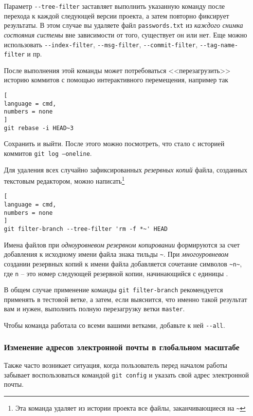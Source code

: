 \documentclass[%
	11pt,
	a4paper,
	utf8,
		]{article}
\begin{document}
Параметр \lstinline{--tree-filter} заставляет выполнить указанную команду после перехода к каждой следующей версии проекта, а затем повторно фиксирует результаты. В этом случае вы удаляете файл \texttt{passwords.txt} из \emph{каждого снимка состояния системы} вне зависимости от того, существует он или нет. Еще можно использовать \lstinline{--index-filter}, \lstinline{--msg-filter}, \lstinline{--commit-filter}, \lstinline{--tag-name-filter} и пр.

После выполнения этой команды может потребоваться <<перезагрузить>> историю коммитов с помощью интерактивного перемещения, например так
\begin{lstlisting}[
language = cmd,
numbers = none
]
git rebase -i HEAD~3
\end{lstlisting}

Сохранить и выйти. После этого можно посмотреть, что стало с историей коммитов \texttt{git log --oneline}.

Для удаления всех случайно зафиксированных \emph{резервных копий} файла, созданных текстовым редактором, можно написать\footnote{Эта команда удаляет из истории проекта все файлы, заканчивающиеся на \texttt{\~}}

\begin{lstlisting}[
language = cmd,
numbers = none
]
git filter-branch --tree-filter 'rm -f *~' HEAD
\end{lstlisting}

Имена файлов при \emph{одноуровневом резервном копировании} формируются за счет добавления к исходному имени файла знака тильды \lstinline{~}. При \emph{многоуровневом} создании резервных копий к имени файла добавляется сочетание символов \lstinline{~n~}, где \texttt{n} -- это номер следующей резервной копии, начинающийся с единицы \cite[стр.~230]{sobel:2011}.

В общем случае применение команды \lstinline{git filter-branch} рекомендуется применять в тестовой ветке, а затем, если выяснится, что именно такой результат вам и нужен, выполнить полную перезагрузку ветки \texttt{master}.

Чтобы команда работала со всеми вашими ветками, добавьте к ней \lstinline{--all}.

\subsubsection{Изменение адресов электронной почты в глобальном масштабе}

Также часто возникает ситуация, когда пользователь перед началом работы забывает воспользоваться командой \lstinline{git config} и указать свой адрес электронной почты.
\end{document}
